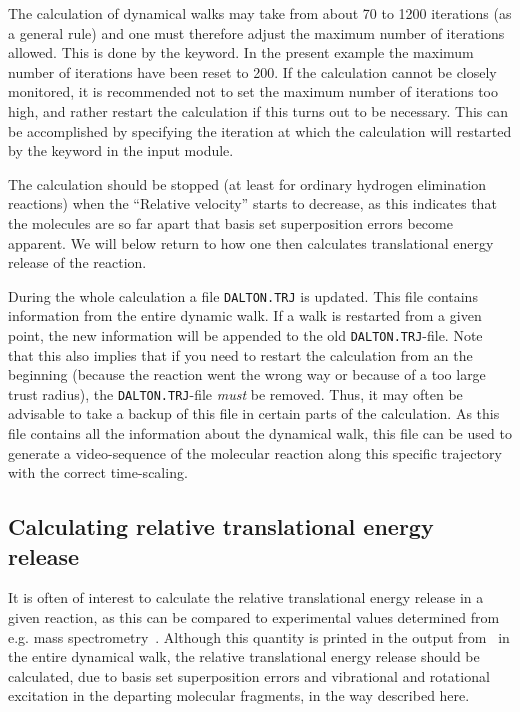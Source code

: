 The calculation of dynamical walks may take from about 70 to 1200
iterations (as a general rule) and one must therefore adjust the
maximum number of iterations allowed. This is done by  the
 keyword. In the present example the maximum number of
iterations have been reset to 200. If the calculation
cannot be closely monitored, it is recommended not to set the maximum
number of iterations too high, and rather
restart the calculation if
this turns out to be necessary. This can be accomplished by specifying
the iteration at which the calculation will restarted by the keyword
 in the  input module.

The calculation should be stopped (at least for ordinary hydrogen
elimination reactions) when the ``Relative velocity'' starts to
decrease, as this indicates that the molecules are so far apart that
basis set superposition errors
become apparent. We will below return to how
one then calculates translational energy release of the reaction.

During the whole calculation a file
\texttt{DALTON.TRJ} is updated. This
file contains information from the entire dynamic walk. If a
walk is restarted from a given point, the new information will be
appended to the old \texttt{DALTON.TRJ}-file. Note that this also implies
that if you need to restart the calculation from an the beginning
(because the reaction went the wrong way or because of a too large trust
radius), the
\texttt{DALTON.TRJ}-file {\em must} be removed. Thus, it may often be
advisable to take a backup of this file in certain parts of the
calculation. As this file contains all the information about the
dynamical walk, this file can be used to generate a video-sequence of
the molecular reaction along this specific trajectory with the correct
time-scaling.

\subsection{Calculating relative translational energy release}

It is often of interest to calculate the relative translational energy
release in a given reaction, as this can be compared to experimental
values determined from e.g. mass
spectrometry~\cite{theuhjajcpl173}. Although
this quantity
is printed in the output from \dalton\ in the entire dynamical walk, the
relative translational energy release should be calculated, due to
basis set superposition errors and
vibrational and rotational
excitation in the departing molecular
fragments, in the way described here.

